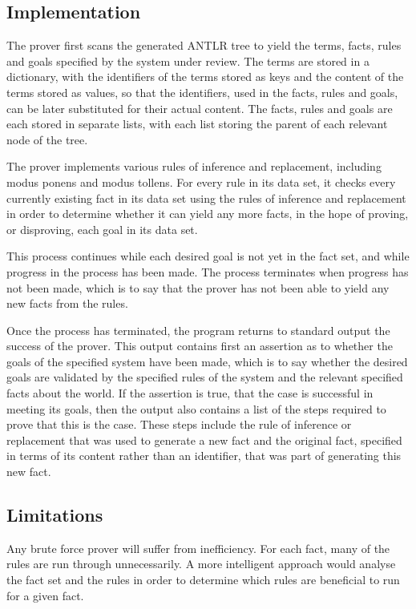 \documentclass{l4proj}
\begin{document}
\subsection{Implementation}
The prover first scans the generated ANTLR tree to yield the terms, facts, rules and goals specified by the system under review. The terms are stored in a dictionary, with the identifiers of the terms stored as keys and the content of the terms stored as values, so that the identifiers, used in the facts, rules and goals, can be later substituted for their actual content. The facts, rules and goals are each stored in separate lists, with each list storing the parent of each relevant node of the tree. 

The prover implements various rules of inference and replacement, including modus ponens and modus tollens. For every rule in its data set, it checks every currently existing fact in its data set using the rules of inference and replacement in order to determine whether it can yield any more facts, in the hope of proving, or disproving, each goal in its data set. 

This process continues while each desired goal is not yet in the fact set, and while progress in the process has been made. The process terminates when progress has not been made, which is to say that the prover has not been able to yield any new facts from the rules. 

Once the process has terminated, the program returns to standard output the success of the prover. This output contains first an assertion as to whether the goals of the specified system have been made, which is to say whether the desired goals are validated by the specified rules of the system and the relevant specified facts about the world. If the assertion is true, that the case is successful in meeting its goals, then the output also contains a list of the steps required to prove that this is the case. These steps include the rule of inference or replacement that was used to generate a new fact and the original fact, specified in terms of its content rather than an identifier, that was part of generating this new fact. 

\subsection{Limitations}
Any brute force prover will suffer from inefficiency. For each fact, many of the rules are run through unnecessarily. A more intelligent approach would analyse the fact set and the rules in order to determine which rules are beneficial to run for a given fact. 
\end{document}
